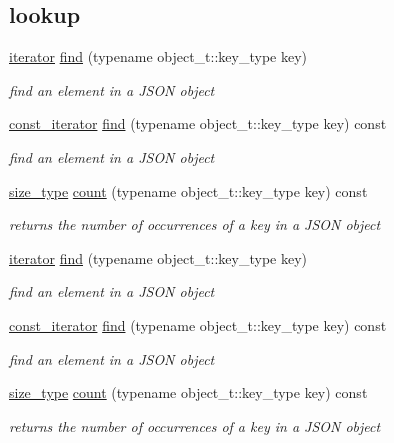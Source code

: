 \subsection*{lookup}
\begin{DoxyCompactItemize}
\item 
\hyperlink{classnlohmann_1_1basic__json_1_1iterator}{iterator} \hyperlink{classnlohmann_1_1basic__json_affe7e160e7bb06eed83c8b437af4692f}{find} (typename object\-\_\-t\-::key\-\_\-type key)
\begin{DoxyCompactList}\small\item\em find an element in a J\-S\-O\-N object \end{DoxyCompactList}\item 
\hyperlink{classnlohmann_1_1basic__json_1_1const__iterator}{const\-\_\-iterator} \hyperlink{classnlohmann_1_1basic__json_aaa687595d7627925fbf6d6eb97e2021e}{find} (typename object\-\_\-t\-::key\-\_\-type key) const 
\begin{DoxyCompactList}\small\item\em find an element in a J\-S\-O\-N object \end{DoxyCompactList}\item 
\hyperlink{classnlohmann_1_1basic__json_a1579a8f72a230358d6cd1a6e8a62859b}{size\-\_\-type} \hyperlink{classnlohmann_1_1basic__json_a51b0036310d8aa5858fecc0d91127f27}{count} (typename object\-\_\-t\-::key\-\_\-type key) const 
\begin{DoxyCompactList}\small\item\em returns the number of occurrences of a key in a J\-S\-O\-N object \end{DoxyCompactList}\item 
\hyperlink{classnlohmann_1_1basic__json_1_1iterator}{iterator} \hyperlink{classnlohmann_1_1basic__json_affe7e160e7bb06eed83c8b437af4692f}{find} (typename object\-\_\-t\-::key\-\_\-type key)
\begin{DoxyCompactList}\small\item\em find an element in a J\-S\-O\-N object \end{DoxyCompactList}\item 
\hyperlink{classnlohmann_1_1basic__json_1_1const__iterator}{const\-\_\-iterator} \hyperlink{classnlohmann_1_1basic__json_aaa687595d7627925fbf6d6eb97e2021e}{find} (typename object\-\_\-t\-::key\-\_\-type key) const 
\begin{DoxyCompactList}\small\item\em find an element in a J\-S\-O\-N object \end{DoxyCompactList}\item 
\hyperlink{classnlohmann_1_1basic__json_a1579a8f72a230358d6cd1a6e8a62859b}{size\-\_\-type} \hyperlink{classnlohmann_1_1basic__json_a51b0036310d8aa5858fecc0d91127f27}{count} (typename object\-\_\-t\-::key\-\_\-type key) const 
\begin{DoxyCompactList}\small\item\em returns the number of occurrences of a key in a J\-S\-O\-N object \end{DoxyCompactList}\end{DoxyCompactItemize}
